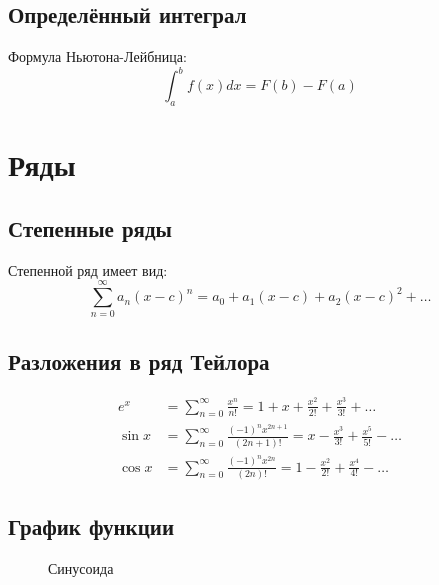 \documentclass[12pt,a4paper]{report}
\begin{document}
\section{Определённый интеграл}
Формула Ньютона-Лейбница:
\begin{equation}
\int_a^b f(x) dx = F(b) - F(a)
\end{equation}

\chapter{Ряды}

\section{Степенные ряды}
Степенной ряд имеет вид:
\begin{equation}
\sum_{n=0}^{\infty} a_n (x - c)^n = a_0 + a_1(x-c) + a_2(x-c)^2 + \ldots
\end{equation}

\section{Разложения в ряд Тейлора}
\begin{align}
e^x &= \sum_{n=0}^{\infty} \frac{x^n}{n!} = 1 + x + \frac{x^2}{2!} + \frac{x^3}{3!} + \ldots \\
\sin x &= \sum_{n=0}^{\infty} \frac{(-1)^n x^{2n+1}}{(2n+1)!} = x - \frac{x^3}{3!} + \frac{x^5}{5!} - \ldots \\
\cos x &= \sum_{n=0}^{\infty} \frac{(-1)^n x^{2n}}{(2n)!} = 1 - \frac{x^2}{2!} + \frac{x^4}{4!} - \ldots
\end{align}

\section{График функции}
\begin{figure}[H]
\centering
{}
\caption{Синусоида}
\end{figure}
\end{document}
